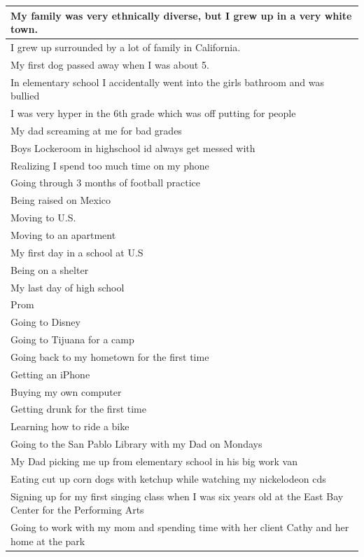 \documentclass[
  .7em,
  letterpaper,
  DIV=11,
  numbers=noendperiod]{scrartcl}
\begin{document}
\begin{table}
\begin{tabular}{l}
\hline
My family was very ethnically diverse, but I grew up in a very white town.\\
\hline
I grew up surrounded by a lot of family in California.\\
\hline
My first dog passed away when I was about 5.\\
\hline
In elementary school I accidentally went into the girls bathroom and was bullied\\
\hline
I was very hyper in the 6th grade which was off putting for people\\
\hline
My dad screaming at me for bad grades\\
\hline
Boys Lockeroom in highschool id always get messed with\\
\hline
Realizing I spend too much time on my phone\\
\hline
Going through 3 months of football practice\\
\hline
Being raised on Mexico\\
\hline
Moving to U.S.\\
\hline
Moving to an apartment\\
\hline
My first day in a school at U.S\\
\hline
Being on a shelter\\
\hline
My last day of high school\\
\hline
Prom\\
\hline
Going to Disney\\
\hline
Going to Tijuana for a camp\\
\hline
Going back to my hometown for the first time\\
\hline
Getting an iPhone\\
\hline
Buying my own computer\\
\hline
Getting drunk for the first time\\
\hline
Learning how to ride a bike\\
\hline
Going to the San Pablo Library with my Dad on Mondays\\
\hline
My Dad picking me up from elementary school in his big work van\\
\hline
Eating cut up corn dogs with ketchup while watching my nickelodeon cds\\
\hline
Signing up for my first singing class when I was six years old at the East Bay Center for the Performing Arts\\
\hline
Going to work with my mom and spending time with her client Cathy and her home at the park\\

\end{tabular}
\end{table}
\end{document}

